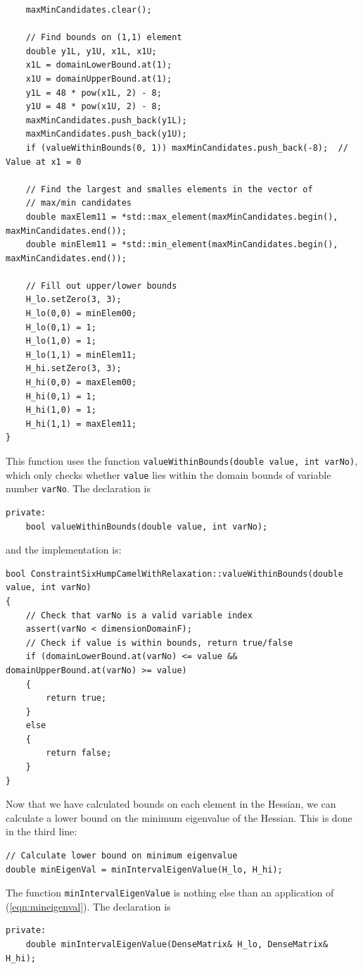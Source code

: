 \begin{lstlisting}
	maxMinCandidates.clear();

	// Find bounds on (1,1) element
	double y1L, y1U, x1L, x1U;
	x1L = domainLowerBound.at(1);
	x1U = domainUpperBound.at(1);
	y1L = 48 * pow(x1L, 2) - 8;
	y1U = 48 * pow(x1U, 2) - 8;
	maxMinCandidates.push_back(y1L);
	maxMinCandidates.push_back(y1U);
	if (valueWithinBounds(0, 1)) maxMinCandidates.push_back(-8);  // Value at x1 = 0
	
	// Find the largest and smalles elements in the vector of
	// max/min candidates
	double maxElem11 = *std::max_element(maxMinCandidates.begin(), maxMinCandidates.end());
	double minElem11 = *std::min_element(maxMinCandidates.begin(), maxMinCandidates.end());

	// Fill out upper/lower bounds
	H_lo.setZero(3, 3);
	H_lo(0,0) = minElem00;
	H_lo(0,1) = 1;
	H_lo(1,0) = 1;
	H_lo(1,1) = minElem11;
	H_hi.setZero(3, 3);
	H_hi(0,0) = maxElem00;
	H_hi(0,1) = 1;
	H_hi(1,0) = 1;
	H_hi(1,1) = maxElem11;
}
\end{lstlisting}
This function uses the function \texttt{valueWithinBounds(double value, int varNo)}, which only checks whether \texttt{value} lies within the domain bounds of variable number \texttt{varNo}. The declaration is
\begin{lstlisting}
private:
	bool valueWithinBounds(double value, int varNo);
\end{lstlisting}
and the implementation is:
\begin{lstlisting}
bool ConstraintSixHumpCamelWithRelaxation::valueWithinBounds(double value, int varNo)
{
	// Check that varNo is a valid variable index
	assert(varNo < dimensionDomainF);
	// Check if value is within bounds, return true/false
	if (domainLowerBound.at(varNo) <= value && domainUpperBound.at(varNo) >= value)
	{
		return true;
	}
	else
	{
		return false;
	}
}
\end{lstlisting}
Now that we have calculated bounds on each element in the Hessian, we can calculate a lower bound on the minimum eigenvalue of the Hessian. This is done in the third line:
\begin{lstlisting}
// Calculate lower bound on minimum eigenvalue
double minEigenVal = minIntervalEigenValue(H_lo, H_hi);
\end{lstlisting}
The function \texttt{minIntervalEigenValue} is nothing else than an application of (\ref{eqn:mineigenval}). The declaration is
\begin{lstlisting}
private:
	double minIntervalEigenValue(DenseMatrix& H_lo, DenseMatrix& H_hi);
\end{lstlisting}
